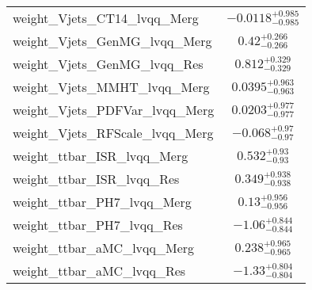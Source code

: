 \begin{tabular}{|l|c|}
weight\_Vjets\_CT14\_lvqq\_Merg & $-0.0118^{+0.985}_{-0.985}$ \\
weight\_Vjets\_GenMG\_lvqq\_Merg & $0.42^{+0.266}_{-0.266}$ \\
weight\_Vjets\_GenMG\_lvqq\_Res & $0.812^{+0.329}_{-0.329}$ \\
weight\_Vjets\_MMHT\_lvqq\_Merg & $0.0395^{+0.963}_{-0.963}$ \\
weight\_Vjets\_PDFVar\_lvqq\_Merg & $0.0203^{+0.977}_{-0.977}$ \\
weight\_Vjets\_RFScale\_lvqq\_Merg & $-0.068^{+0.97}_{-0.97}$ \\
weight\_ttbar\_ISR\_lvqq\_Merg & $0.532^{+0.93}_{-0.93}$ \\
weight\_ttbar\_ISR\_lvqq\_Res & $0.349^{+0.938}_{-0.938}$ \\
weight\_ttbar\_PH7\_lvqq\_Merg & $0.13^{+0.956}_{-0.956}$ \\
weight\_ttbar\_PH7\_lvqq\_Res & $-1.06^{+0.844}_{-0.844}$ \\
weight\_ttbar\_aMC\_lvqq\_Merg & $0.238^{+0.965}_{-0.965}$ \\
weight\_ttbar\_aMC\_lvqq\_Res & $-1.33^{+0.804}_{-0.804}$ \\
\hline
\end{tabular}
